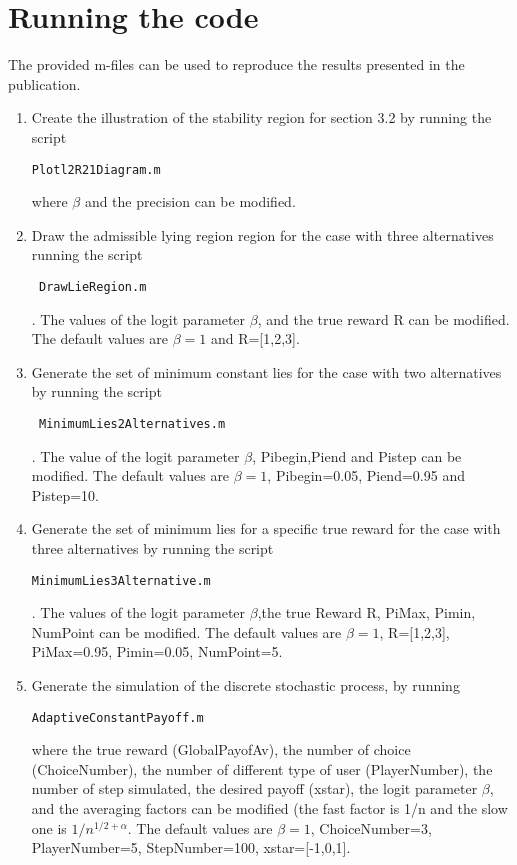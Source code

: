 \documentclass[english]{article}
\begin{document}
\section{Running the code}
The provided m-files can be used to reproduce the results presented in the publication.
\begin{enumerate}
\item Create the illustration of the stability region for section 3.2 by running the script\begin{verbatim}Plotl2R21Diagram.m\end{verbatim} where $\beta$ and the precision can be modified.

\item Draw the admissible lying region region for the case with three alternatives running the script
\begin{verbatim} DrawLieRegion.m\end{verbatim}.
The values of the logit parameter $\beta$, and the true reward R can be modified.
The default values are $\beta=1$ and R=[1,2,3].

 \item Generate the set of minimum constant lies for the case with two alternatives by running the script
 \begin{verbatim} MinimumLies2Alternatives.m\end{verbatim}.
The value of the logit parameter $\beta$, Pibegin,Piend and Pistep can be modified.
The default values are $\beta=1$, Pibegin=0.05, Piend=0.95 and Pistep=10.
 
 \item Generate the set of minimum lies for a specific true reward for the case with three alternatives by running the script
 \begin{verbatim}MinimumLies3Alternative.m \end{verbatim}.
The values of the logit parameter $\beta$,the true Reward R, PiMax, Pimin, NumPoint can be modified.
The default values are $\beta=1$, R=[1,2,3], PiMax=0.95, Pimin=0.05, NumPoint=5.
 
 \item Generate the simulation of the discrete stochastic process, by running
 \begin{verbatim}AdaptiveConstantPayoff.m\end{verbatim}
 where the true reward (GlobalPayofAv), the number of choice (ChoiceNumber), the number of different type of user (PlayerNumber), the number of step simulated, the desired payoff (xstar), the logit parameter $\beta$, and the averaging factors can be modified (the fast factor is 1/n and the slow one is $1/n^{1/2+\alpha}$. The default values are $\beta=1$, ChoiceNumber=3, PlayerNumber=5, StepNumber=100, xstar=[-1,0,1].
\end{enumerate}
\end{document}
